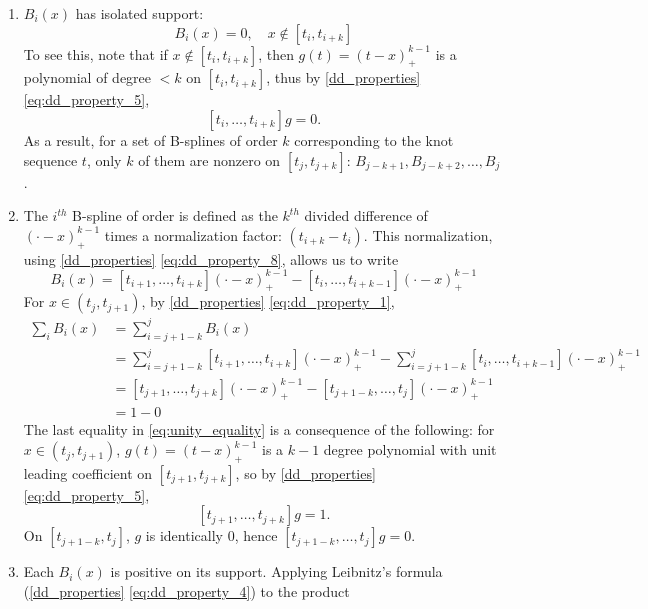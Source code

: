 \documentclass[12pt]{article}
\begin{document}
\begin{enumerate} \label{eq:BS_properties}
\item \label{eq:BS_property_1} $B_i\left(x\right)$ has isolated support:
\[
B_i\left(x\right) = 0, \quad x \not \in \left[t_{i},t_{i+k}\right]
\]
To see this, note that if $x \not \in \left[t_{i},t_{i+k}\right]$, then $g\left(t \right) = \left(t-x\right)^{k-1}_+$ is a polynomial of degree $< k$ on $\left[t_{i},t_{i+k}\right]$, thus by \ref{dd_properties} \ref{eq:dd_property_5},
\[
\left[t_{i},\dots,t_{i+k}\right]g = 0.
\]
As a result, for a set of B-splines of order $k$ corresponding to the knot sequence $t$, only $k$ of them are nonzero on $\left[t_{j},t_{j+k}\right]$: $B_{j-k+1},B_{j-k+2},\dots,B_{j}$.
\item \label{eq:BS_property_2} The $i^{th}$ B-spline of order is defined as the $k^{th}$ divided difference of $\left(\cdot - x\right)_+^{k-1}$ times a normalization factor: $\left(t_{i+k}-t_i\right)$. This normalization, using \ref{dd_properties} \ref{eq:dd_property_8}, allows us to write 
\begin{equation} \label{eq:BS_norm_rr}
B_i\left(x\right)=\left[t_{i+1},\dots,t_{i+k} \right]\left(\cdot - x\right)_+^{k-1} - \left[t_{i},\dots,t_{i+k-1} \right]\left(\cdot - x\right)_+^{k-1}
\end{equation}
For $x \in \left(t_{j},t_{j+1}\right)$, by \ref{dd_properties} \ref{eq:dd_property_1},
\begin{align}
\sum_{i} B_i\left(x\right) &=  \sum_{i=j+1-k}^{j} B_i\left(x\right) \nonumber\\
&= \sum_{i=j+1-k}^{j} \left[t_{i+1},\dots,t_{i+k} \right] \left(\cdot - x\right)_+^{k-1} - \sum_{i=j+1-k}^{j} \left[t_{i},\dots,t_{i+k-1} \right] \left(\cdot - x\right)_+^{k-1} \nonumber \\
&= \left[t_{j+1},\dots,t_{j+k} \right] \left(\cdot - x\right)_+^{k-1} - \left[t_{j+1-k},\dots,t_{j} \right] \left(\cdot - x\right)_+^{k-1} \nonumber \\
&= 1 - 0 \label{eq:unity_equality}
\end{align}
The last equality in \ref{eq:unity_equality} is a consequence of the following: for $x \in \left(t_j,t_{j+1}\right)$, $g\left(t\right)=\left(t - x\right)_+^{k-1}$ is a $k-1$ degree polynomial with unit leading coefficient on $\left[ t_{j+1},t_{j+k} \right]$, so by \ref{dd_properties} \ref{eq:dd_property_5}, 
\[
\left[ t_{j+1},\dots,t_{j+k} \right]g=1.
\]
On $\left[ t_{j+1-k},t_{j} \right]$, $g$ is identically $0$, hence $\left[ t_{j+1-k},\dots,t_{j} \right]g = 0$.   
\item \label{eq:BS_property_3}Each $B_i\left(x\right)$ is positive on its support. Applying Leibnitz's formula (\ref{dd_properties} \ref{eq:dd_property_4}) to the product

\end{enumerate}
\end{document}
